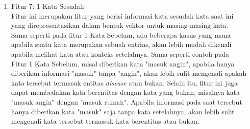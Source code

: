 \begin{enumerate}
 \item Fitur 7: 1 Kata Sesudah\\
 Fitur ini merupakan fitur yang berisi informasi kata sesudah kata saat ini yang direpresentasikan dalam bentuk vektor untuk masing-masing kata. Sama seperti pada fitur 1 Kata Sebelum, ada beberapa kasus yang mana apabila suatu kata merupakan sebuah entitas, akan lebih mudah dikenali apabila melihat kata atau konteks setelahnya. Sama seperti contoh pada Fitur 1 Kata Sebelum, misal diberikan kata "masuk angin", apabila hanya diberikan informasi "masuk" tanpa "angin", akan lebih sulit mengenali apakah kata tersebut termasuk entitas \textit{disease} atau bukan. Selain itu, fitur ini juga dapat membedakan kata berentitas dengan kata yang bukan, misalnya kata "masuk angin" dengan "masuk rumah". Apabila informasi pada saat tersebut hanya diberikan kata "masuk" saja tanpa kata setelahnya, akan lebih sulit mengenali kata tersebut termasuk kata berentitas atau bukan.
  
\end{enumerate}


